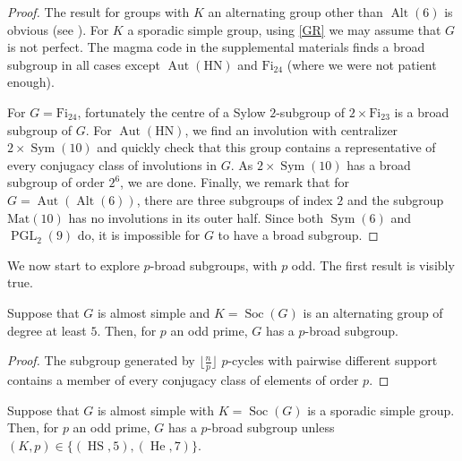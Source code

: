 \documentclass[12pt,a4paper]{amsart}
\DeclareMathOperator{\Aut}{Aut}
\DeclareMathOperator{\HS}{HS}
\DeclareMathOperator{\He}{He}
\DeclareMathOperator{\PGL}{PGL}
\DeclareMathOperator{\Alt}{Alt}
\DeclareMathOperator{\Sym}{Sym}
\DeclareMathOperator{\Soc}{Soc}
\begin{document}
\begin{proof}The result for groups with $K$ an alternating group other than $\Alt(6)$ is obvious (see \cite[Lemma 2.1]{GuralnickRobinson1}). For $K$ a sporadic simple group, using \cref{GR} we may assume that $G$ is not perfect. The   {\sc magma} \cite{Magma} code in the supplemental materials finds a broad subgroup in all cases except $\Aut(\mathrm{HN})$ and $\mathrm{Fi}_{24}$ (where we were not patient enough).

For $G=\mathrm{Fi}_{24}$, fortunately the centre of a Sylow $2$-subgroup of $2\times \mathrm{Fi}_{23}$ is a broad subgroup of $G$. For $\Aut(\mathrm{HN})$, we find an involution with centralizer $2\times \Sym(10)$ and quickly  check that this group contains a representative of every conjugacy class of involutions in $G$. As $2\times \Sym(10)$   has a broad subgroup of order $2^6$, we are done. Finally, we remark that for $G=\Aut(\Alt(6))$, there are three subgroups of index $2$ and the subgroup $\mathrm{Mat}(10)$ has no involutions in its outer half. Since both $\Sym(6) $ and $\PGL_2(9)$ do, it is impossible for $G$ to have a broad subgroup.
\end{proof}



We now start to explore $p$-broad subgroups, with $p$ odd.
The first result is visibly true.
\begin{lemma}\label{lem:pbroadalt} Suppose that $G$ is almost simple and $K=\Soc(G)$ is an alternating group of degree at least $5$. Then, for $p$ an odd prime, $G$ has a $p$-broad subgroup.
\end{lemma}

\begin{proof} The subgroup generated by $\lfloor \frac n p\rfloor $ $p$-cycles with pairwise different support contains a member of every conjugacy class of elements of order $p$.
\end{proof}

\begin{lemma}\label{lem:pbroadspor} Suppose that $G$ is almost simple with $K=\Soc(G)$  is a sporadic simple group. Then, for $p$ an odd prime, $G$ has a $p$-broad subgroup unless $(K,p) \in \{(\HS,5), (\He,7)\}$.
\end{lemma}
\end{document}
